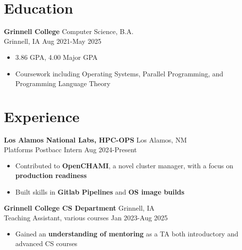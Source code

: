 \documentclass[12pt]{article}
\newcommand{\entry}[4]{{{\textbf{#1}}} \hfill #3 \\ #2 \hfill #4}
\begin{document}
\noindent %
\begin{minipage}[t]{0.63\textwidth}

  \section{Education}
  \entry{Grinnell College}{Grinnell, IA}{Computer Science, B.A.}{Aug 2021-May 2025}
  \begin{itemize}[noitemsep,rightmargin=0mm,topsep=0pt,leftmargin=.75cm]
    \item 3.86 GPA, 4.00 Major GPA
    \item Coursework including Operating Systems, Parallel Programming, and Programming Language Theory
  \end{itemize}
  \vspace{-15pt} %

  \section{Experience}
  \entry{Los Alamos National Labs, HPC-OPS}{Platforms Postbacc Intern}{Los Alamos, NM}{Aug 2024-Present}
  \begin{itemize}[noitemsep,rightmargin=0mm,topsep=0pt,leftmargin=.75cm]
	  \item Contributed to \textbf{OpenCHAMI}, a novel cluster manager, with a focus on \textbf{production readiness}
    \item Built skills in \textbf{Gitlab Pipelines} and \textbf{OS image builds}
  \end{itemize}

  \medskip

  \entry{Grinnell College CS Department}{Teaching Assistant, various courses}{Grinnell, IA}{Jan 2023-Aug 2025}
  \begin{itemize}[noitemsep,rightmargin=0mm,topsep=0pt,leftmargin=.75cm]
	  \item Gained an \textbf{understanding of mentoring} as a TA both introductory and advanced CS courses
  \end{itemize}

  \medskip


\end{minipage}
\end{document}
